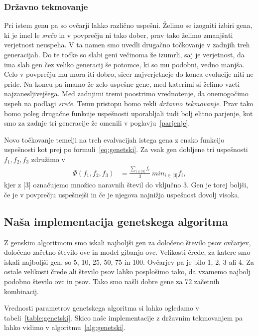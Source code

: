 \subsubsection{Državno tekmovanje}

Pri istem genu pa so ovčarji lahko različno uspešni. Želimo se izogniti izbiri gena, ki je imel le \textit{srečo} in v povprečju ni tako dober, prav tako želimo zmanjšati verjetnost neuspeha. V ta namen smo uvedli drugačno točkovanje v zadnjih treh generacijah. Do te točke so slabi geni večinoma že izumrli, saj je verjetnost, da ima slab gen čez veliko generacij še potomce, ki so mu podobni, vedno manjša. Celo v povprečju mu mora iti dobro, sicer najverjetneje do konca evolucije niti ne pride. Na koncu pa imamo že zelo uspešne gene, med katerimi si želimo vzeti najzanesljivejšega. Med zadnjimi tremi poostrimo vrednotenje, da onemogočimo uspeh na podlagi \textit{sreče}. Temu pristopu bomo rekli \textit{državno tekmovanje}. Prav tako bomo poleg drugačne funkcije uspešnosti uporabljali tudi bolj elitno parjenje, kot smo za zadnje tri generacije že omenili v poglavju~\ref{parjenje}.

Novo točkovanje temelji na treh evalvacijah istega gena z enako funkcijo uspešnosti kot prej po formuli~\eqref{eq:genetski}. Za vsak gen dobljene tri uspešnosti $f_1, f_2, f_3$ združimo v 
\begin{align}
\Phi(f_1, f_2, f_3) &=\frac{\sum_{i\in\lbrack 3\rbrack} f_i}{3}~ min_{i\in\lbrack 3\rbrack} f_i, \label{eq:drzavno}
\end{align}
kjer z $\lbrack 3\rbrack$ označujemo množico naravnih števil do vključno 3. Gen je torej boljši, če je v povprečju uspešnejši in če je njegova najnižja uspešnost dovolj visoka.

\subsection{Naša implementacija genetskega algoritma}

Z genskim algoritmom smo iskali najboljši gen za določeno število psov ovčarjev, določeno začetno število ovc in model gibanja ovc. Velikosti črede, za katere smo iskali najboljši gen, so 5, 10, 25, 50, 75 in 100. Ovčarjev pa je bilo 1, 2, 3 ali 4. Za ostale velikosti črede ali število psov lahko posplošimo tako, da vzamemo najbolj podobno število ovc in psov. Tako smo našli dobre gene za 72 začetnih kombinacij.

Vrednosti parametrov genetskega algoritma si lahko ogledamo v tabeli~\ref{table:genetski}. Skico naše implementacije z državnim tekmovanjem pa lahko vidimo v algoritmu~\ref{alg:genetski}.

